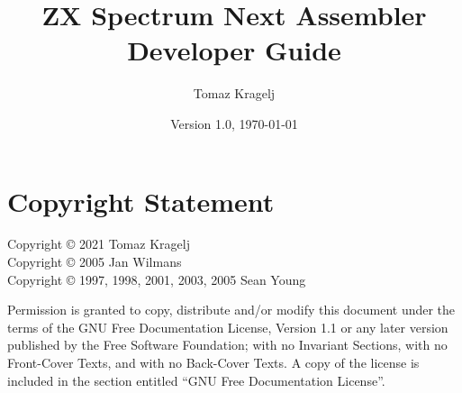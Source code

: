 \documentclass[12pt,twoside,openright,a4paper]{book}
\begin{document}
\frontmatter


\title{ZX Spectrum Next Assembler Developer Guide}
\author{Tomaz Kragelj}
\date{Version 1.0, \today}

\maketitle




\chapter*{Copyright Statement}

Copyright {\copyright} 2021 Tomaz Kragelj\\
Copyright {\copyright} 2005 Jan Wilmans\\
Copyright {\copyright} 1997, 1998, 2001, 2003, 2005 Sean Young

Permission is granted to copy, distribute and/or modify this document under the terms of the GNU Free Documentation License, Version 1.1 or any later version published by the Free Software Foundation; with no Invariant Sections, with no Front-Cover Texts, and with no Back-Cover Texts. A copy of the license is included in the section entitled ``GNU Free Documentation License''.



\setcounter{page}{0}
\pagestyle{clean}


\setcounter{tocdepth}{1}
\dominitoc \tableofcontents

\noptcrule
\nomtcrule									%
\renewcommand{\mtcoffset}{-1.5em}			%
\def\mtcSfont{\normalsize}
\def\mtcSSfont{\small}



\mainmatter
\end{document}

